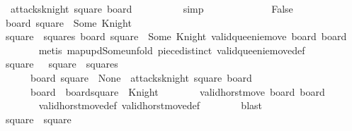 \begin{isabellebody}
\ {\isacharbackquoteopen}{\isasymnot}\ attacks{\isacharunderscore}knight\ square{\isacharprime}\ board{\isacharbackquoteclose}\isanewline
\ \ \ \ \ \ \ \ \isamarkupfalse%
\ simp\isanewline
\ \ \ \ \isamarkupfalse%
\isanewline
\ \ \isamarkupfalse%
\isanewline
\ \ \ \ \isamarkupfalse%
\ False\isanewline
\ \ \ \ \isamarkupfalse%
\ {\isachardoublequoteopen}board{\isacharprime}\ square\ {\isacharequal}\ Some\ Knight{\isachardoublequoteclose}\isanewline
\ \ \ \ \ \ \isamarkupfalse%
\ {\isacharbackquoteopen}square\ {\isasymin}\ squares{\isacharbackquoteclose}\ {\isacharbackquoteopen}board{\isacharprime}{\isacharprime}\ square\ {\isacharequal}\ Some\ Knight{\isacharbackquoteclose}\ {\isacharbackquoteopen}valid{\isacharunderscore}queenie{\isacharunderscore}move\ board{\isacharprime}\ board{\isacharprime}{\isacharprime}{\isacharbackquoteclose}\isanewline
\ \ \ \ \ \ \isamarkupfalse%
\ {\isacharparenleft}metis\ map{\isacharunderscore}upd{\isacharunderscore}Some{\isacharunderscore}unfold\ piece{\isachardot}distinct{\isacharparenleft}{}{\isacharparenright}\ valid{\isacharunderscore}queenie{\isacharunderscore}move{\isacharunderscore}def{\isacharparenright}\isanewline
\isanewline
\ \ \ \ \isamarkupfalse%
\ square{\isacharprime}\ \ {\isacharasterisk}{\isacharcolon}\ {\isachardoublequoteopen}square{\isacharprime}\ {\isasymin}\ squares{\isachardoublequoteclose}\isanewline
\ \ \ \ \ \ {\isachardoublequoteopen}board\ square{\isacharprime}\ {\isacharequal}\ None{\isachardoublequoteclose}\ {\isachardoublequoteopen}{\isasymnot}\ attacks{\isacharunderscore}knight\ square{\isacharprime}\ board{\isachardoublequoteclose}\ \isanewline
\ \ \ \ \ \ {\isachardoublequoteopen}board{\isacharprime}\ {\isacharequal}\ board{\isacharparenleft}square{\isacharprime}\ {\isasymmapsto}\ Knight{\isacharparenright}{\isachardoublequoteclose}\isanewline
\ \ \ \ \ \ \isamarkupfalse%
\ {\isacharbackquoteopen}valid{\isacharunderscore}horst{\isacharunderscore}move\ board\ board{\isacharprime}{\isacharbackquoteclose}\isanewline
\ \ \ \ \ \ \isamarkupfalse%
\ valid{\isacharunderscore}horst{\isacharunderscore}move{\isacharunderscore}def\ valid{\isacharunderscore}horst{\isacharunderscore}move{\isacharprime}{\isacharunderscore}def\isanewline
\ \ \ \ \ \ \isamarkupfalse%
\ blast\isanewline
\ \ \ \ \isamarkupfalse%
\ \isamarkupfalse%
\ {\isachardoublequoteopen}square\ {\isacharequal}\ square{\isacharprime}{\isachardoublequoteclose}\isanewline

\end{isabellebody}
